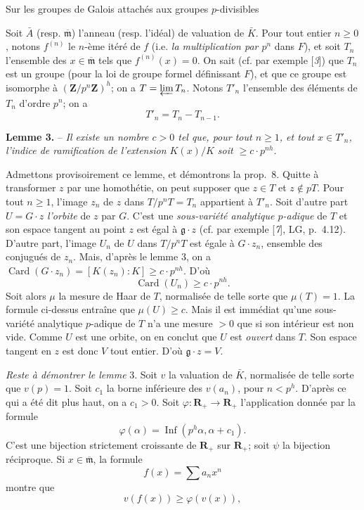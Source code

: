 \begin{center}\small Sur les groupes de Galois attachés aux groupes $p$-divisibles\end{center}
Soit $\bar A$ (resp. $\overline{\mathfrak{m}}$) l’anneau (resp. l’idéal) de valuation de $\bar K$. Pour tout entier $n\geqslant 0$, notons $f^{(n)}$ le $n$-ème itéré de $f$ (i.e. \textit{la multiplication par $p^n$} dans $F$), et soit $T_n$ l’ensemble des $x\in\overline{\mathfrak{m}}$ tels que $f^{(n)}(x)=0$. On sait (cf. par exemple [\textit{3}]) que $T_n$ est un groupe (pour la loi de groupe formel définissant $F$), et que ce groupe est isomorphe à $(\mathbf{Z}/p^n\mathbf{Z})^h$; on a $T=\varprojlim T_n$. Notons $T'_n$ l’ensemble des éléments de $T_n$ d’ordre $p^n$; on a
\[
T'_n=T_n-T_{n-1}.
\]

\textbf{Lemme 3.} -- \textit{Il existe un nombre $c>0$ tel que, pour tout $n\geqslant 1$, et tout $x\in T'_n$, l’indice de ramification de l’extension $K(x)/K$ soit $\geqslant c\cdot p^{nh}$.}

Admettons provisoirement ce lemme, et démontrons la prop.~8. Quitte à transformer $z$ par une homothétie, on peut supposer que $z\in T$ et $z\notin pT$. Pour tout $n\geqslant 1$, l’image $z_n$ de $z$ dans $T/p^nT=T_n$ appartient à $T'_n$. Soit d’autre part $U=G\cdot z$ \textit{l’orbite} de $z$ par $G$. C’est une \textit{sous-variété analytique $p$-adique} de $T$ et son espace tangent au point $z$ est égal à $\mathfrak{g}\cdot z$ (cf. par exemple [\textit{7}], LG, p.~4.12). D’autre part, l’image $U_n$ de $U$ dans $T/p^nT$ est égale à $G\cdot z_n$, ensemble des conjugués de $z_n$. Mais, d’après le lemme 3, on a $\operatorname{Card}(G\cdot z_n)=[K(z_n):K]\geqslant c\cdot p^{nh}$. D’où
\[
\operatorname{Card}(U_n)\geqslant c\cdot p^{nh}.
\]
Soit alors $\mu$ la mesure de Haar de $T$, normalisée de telle sorte que $\mu(T)=1$. La formule ci-dessus entraîne que $\mu(U)\geqslant c$. Mais il est immédiat qu’une sous-variété analytique $p$-adique de $T$ n’a une mesure $>0$ que si son intérieur est non vide. Comme $U$ est une orbite, on en conclut que $U$ est \textit{ouvert} dans $T$. Son espace tangent en $z$ est donc $V$ tout entier. D’où $\mathfrak{g}\cdot z=V$.

\textit{Reste à démontrer le lemme} 3. Soit $v$ la valuation de $\bar K$, normalisée de telle sorte que $v(p)=1$. Soit $c_1$ la borne inférieure des $v(a_n)$, pour $n<p^h$. D’après ce qui a été dit plus haut, on a $c_1>0$. Soit $\varphi:\mathbf{R}_+\to\mathbf{R}_+$ l’application donnée par la formule
\[
\varphi(\alpha)=\operatorname{Inf}(p^h\alpha,\alpha+c_1).
\]
C’est une bijection strictement croissante de $\mathbf{R}_+$ sur $\mathbf{R}_+$; soit $\psi$ la bijection réciproque. Si $x\in\overline{\mathfrak{m}}$, la formule
\[
f(x)=\sum a_nx^n
\]
montre que
\[
v(f(x))\geqslant\varphi(v(x)),
\]
